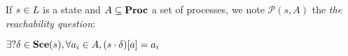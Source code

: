 
\begin{definition}
\label{def:reachability}

 If $s \in L$ is a state and $A \subseteq \mathbf{Proc}$ a set of processes,
 we note $\mathcal{P}(s, A)$ the \emph{the reachability question}:
 \begin{center}
  $\exists? \delta \in \mathbf{Sce}(s), \forall a_i \in A, {(s \cdot \delta)[a]}=a_i$
 \end{center}
\end{definition}


